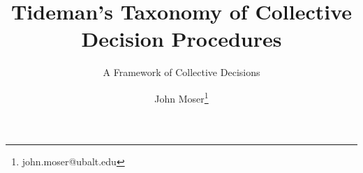 \documentclass[twoside,notitlepage,12pt,appendixprefix=true]{scrartcl}
\begin{document}
    \author{John Moser\thanks{john.moser@ubalt.edu}}

    \title{Tideman's Taxonomy of Collective Decision Procedures}
    \subtitle{A Framework of Collective Decisions}
    \maketitle

    
    \FloatBarrier
    \printbibliography
\end{document}
